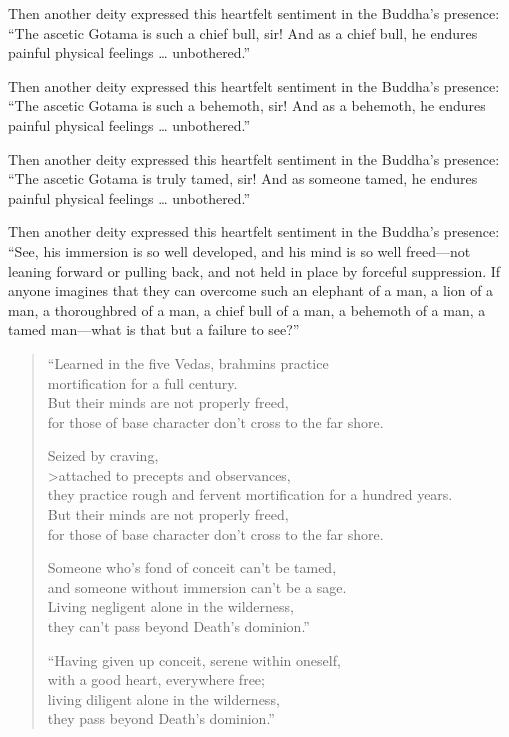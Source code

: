 \documentclass[12pt,openany]{book}%
\begin{document}
Then another deity expressed this heartfelt sentiment in the Buddha’s presence: “The ascetic Gotama is such a chief bull, sir! And as a chief bull, he endures painful physical feelings … unbothered.” 

Then another deity expressed this heartfelt sentiment in the Buddha’s presence: “The ascetic Gotama is such a behemoth, sir! And as a behemoth, he endures painful physical feelings … unbothered.” 

Then another deity expressed this heartfelt sentiment in the Buddha’s presence: “The ascetic Gotama is truly tamed, sir! And as someone tamed, he endures painful physical feelings … unbothered.” 

Then another deity expressed this heartfelt sentiment in the Buddha’s presence: “See, his immersion is so well developed, and his mind is so well freed—not leaning forward or pulling back, and not held in place by forceful suppression. If anyone imagines that they can overcome such an elephant of a man, a lion of a man, a thoroughbred of a man, a chief bull of a man, a behemoth of a man, a tamed man—what is that but a failure to see?” 

\begin{verse}%
“Learned in the five Vedas, brahmins practice \\
mortification for a full century. \\
But their minds are not properly freed, \\
for those of base character don’t cross to the far shore. 

Seized by craving,  \\>attached to precepts and observances, \\
they practice rough and fervent mortification for a hundred years. \\
But their minds are not properly freed, \\
for those of base character don’t cross to the far shore. 

Someone who’s fond of conceit can’t be tamed, \\
and someone without immersion can’t be a sage. \\
Living negligent alone in the wilderness, \\
they can’t pass beyond Death’s dominion.” 

“Having given up conceit, serene within oneself, \\
with a good heart, everywhere free; \\
living diligent alone in the wilderness, \\
they pass beyond Death’s dominion.” 

%
\end{verse}
\end{document}
